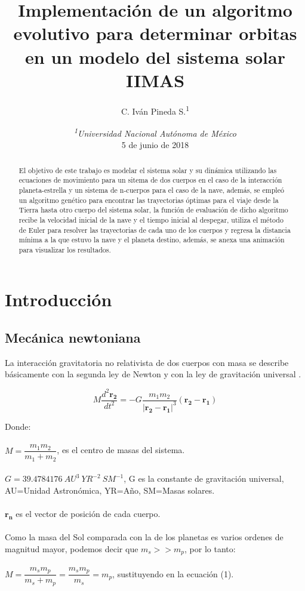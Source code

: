 \documentclass[12pt,letterpaper]{article}
\author{C. Iván Pineda S.\textsuperscript{1} }
\title{Implementación de un algoritmo evolutivo para determinar orbitas en un modelo del sistema solar\\ IIMAS}
\date {\textit{\textsuperscript{1}Universidad Nacional Autónoma de México}
\\ 5 de junio de 2018}
\begin{document}
\maketitle

\begin{abstract}
El objetivo de este trabajo es modelar el sistema solar y su dinámica utilizando las ecuaciones de movimiento para un sitema de dos cuerpos en el caso de la interacción planeta-estrella y un sistema de n-cuerpos para el caso de la nave, además, se empleó un algoritmo genético para encontrar las trayectorias óptimas para el viaje desde la Tierra hasta otro cuerpo del sistema solar, la función de evaluación de dicho algoritmo recibe la velocidad inicial de la nave y el tiempo inicial al despegar, utiliza el método de Euler para resolver las trayectorias de cada uno de los cuerpos y regresa la distancia mínima a la que estuvo la nave y el planeta destino, además, se anexa una animación para visualizar los resultados.
\end{abstract}


\section*{Introducción}

\subsection*{Mecánica newtoniana}

La interacción gravitatoria no relativista de dos cuerpos con masa se describe básicamente con la segunda ley de Newton y con la ley de gravitación universal \citep{jose2000classical}.

\begin{equation}
 M\dfrac{d ^2 \mathbf{r_2}}{d t^2}=-G\dfrac{m_1m_2}{|\mathbf{r_{2}}-\mathbf{r_1}|^3}(\mathbf{r_{2}}-\mathbf{r_1})
\end{equation} 

Donde:
\\
\\
$M=\dfrac{m_1m_2}{m_1+m_2}$, es el centro de masas del sistema.
\\
\\
$G=39.4784176 \ AU^3 \ YR^{-2} \ SM^{-1}$, G es la constante de gravitación universal, AU=Unidad Astronómica, YR=Año, SM=Masas solares.
\\
\\
$\mathbf{r_n} $ es el vector de posición de cada cuerpo.
\\
\\
Como la masa del Sol comparada con la de los planetas es varios ordenes de magnitud mayor, podemos decir que $m_s>>m_p$, por lo tanto:
\\
\\
$M=\dfrac{m_sm_p}{m_s+m_p}=\dfrac{m_sm_p}{m_s}=m_p$, sustituyendo en la ecuación (1).
\end{document}

